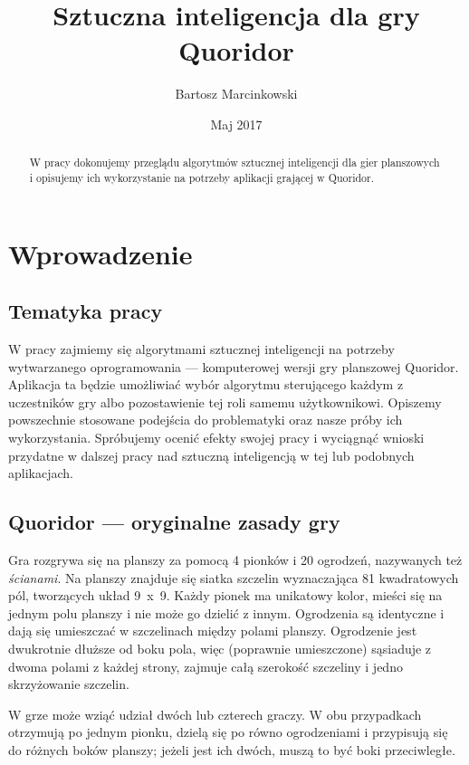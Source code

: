 \documentclass{pracamgr}
\author{Bartosz Marcinkowski}
\title{Sztuczna inteligencja dla gry Quoridor}
\date{Maj 2017}
\begin{document}
\maketitle

\begin{abstract}
W pracy dokonujemy przeglądu algorytmów sztucznej inteligencji dla gier planszowych i opisujemy ich wykorzystanie na potrzeby aplikacji grającej w Quoridor.
\end{abstract}

\tableofcontents


\chapter{Wprowadzenie}

\section{Tematyka pracy}

W pracy zajmiemy się algorytmami sztucznej inteligencji na potrzeby wytwarzanego oprogramowania --- komputerowej wersji gry planszowej Quoridor.
Aplikacja ta będzie umożliwiać wybór algorytmu sterującego każdym z uczestników gry albo pozostawienie tej roli samemu użytkownikowi.
Opiszemy powszechnie stosowane podejścia do problematyki oraz nasze próby ich wykorzystania.
Spróbujemy ocenić efekty swojej pracy i wyciągnąć wnioski przydatne w dalszej pracy nad sztuczną inteligencją w tej lub podobnych aplikacjach.

\section{Quoridor --- oryginalne zasady gry}

Gra rozgrywa się na planszy za pomocą 4 pionków i 20 ogrodzeń, nazywanych też \emph{ścianami}. Na planszy znajduje się siatka szczelin wyznaczająca 81 kwadratowych pól, tworzących układ 9~x~9. Każdy pionek ma unikatowy kolor, mieści się na jednym polu planszy i nie może go dzielić z innym. Ogrodzenia są identyczne i dają się umieszczać w szczelinach między polami planszy. Ogrodzenie jest dwukrotnie dłuższe od boku pola, więc (poprawnie umieszczone) sąsiaduje z dwoma polami z każdej strony, zajmuje całą szerokość szczeliny i jedno skrzyżowanie szczelin.

W grze może wziąć udział dwóch lub czterech graczy. W obu przypadkach otrzymują po jednym pionku, dzielą się po równo ogrodzeniami i przypisują się do różnych boków planszy; jeżeli jest ich dwóch, muszą to być boki przeciwległe.
\end{document}
